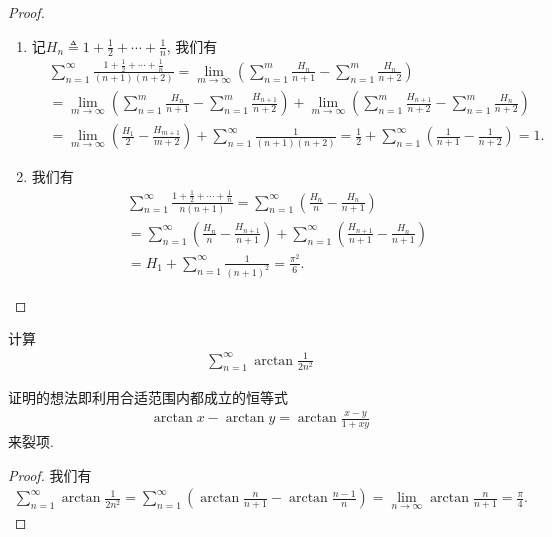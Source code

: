\documentclass[../../main.tex]{subfiles}%
\begin{document}
\begin{proof}
\begin{enumerate}
\item 记$H_n \triangleq 1 + \frac{1}{2} + \cdots + \frac{1}{n}$, 我们有
\begin{align*}
&\sum_{n=1}^{\infty} \frac{1 + \frac{1}{2} + \cdots + \frac{1}{n}}{(n + 1)(n + 2)} = \lim_{m \to \infty} \left( \sum_{n=1}^{m} \frac{H_n}{n + 1} - \sum_{n=1}^{m} \frac{H_n}{n + 2} \right) \\
&= \lim_{m \to \infty} \left( \sum_{n=1}^{m} \frac{H_n}{n + 1} - \sum_{n=1}^{m} \frac{H_{n + 1}}{n + 2} \right) + \lim_{m \to \infty} \left( \sum_{n=1}^{m} \frac{H_{n + 1}}{n + 2} - \sum_{n=1}^{m} \frac{H_n}{n + 2} \right) \\
&= \lim_{m \to \infty} \left( \frac{H_1}{2} - \frac{H_{m + 1}}{m + 2} \right) + \sum_{n=1}^{\infty} \frac{1}{(n + 1)(n + 2)} = \frac{1}{2} + \sum_{n=1}^{\infty} \left( \frac{1}{n + 1} - \frac{1}{n + 2} \right) = 1.
\end{align*}

\item 我们有
\begin{align*}
&\sum_{n=1}^{\infty} \frac{1 + \frac{1}{2} + \cdots + \frac{1}{n}}{n(n + 1)} = \sum_{n=1}^{\infty} \left( \frac{H_n}{n} - \frac{H_n}{n + 1} \right) \\
&= \sum_{n=1}^{\infty} \left( \frac{H_n}{n} - \frac{H_{n + 1}}{n + 1} \right) + \sum_{n=1}^{\infty} \left( \frac{H_{n + 1}}{n + 1} - \frac{H_n}{n + 1} \right) \\
&= H_1 + \sum_{n=1}^{\infty} \frac{1}{(n + 1)^2} = \frac{\pi^2}{6}.
\end{align*}
\end{enumerate}

\end{proof}

\begin{example}
计算
\begin{align*}
\sum_{n=1}^{\infty} \arctan \frac{1}{2n^2}
\end{align*}
\end{example}
\begin{note}
证明的想法即利用合适范围内都成立的恒等式
\begin{align*}
\arctan x - \arctan y = \arctan \frac{x - y}{1 + xy}
\end{align*}
来裂项.
\end{note}
\begin{proof}

我们有
\begin{align*}
\sum_{n=1}^{\infty} \arctan \frac{1}{2n^2} = \sum_{n=1}^{\infty} \left( \arctan \frac{n}{n + 1} - \arctan \frac{n - 1}{n} \right) = \lim_{n \to \infty} \arctan \frac{n}{n + 1} = \frac{\pi}{4}.
\end{align*}

\end{proof}
\end{document}
